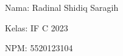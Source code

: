 \documentclass[12pt,a4paper]{article}
\date{}
\begin{document}
Nama: Radinal Shidiq Saragih

Kelas: IF C 2023

NPM: 5520123104

%
%
\end{document}
